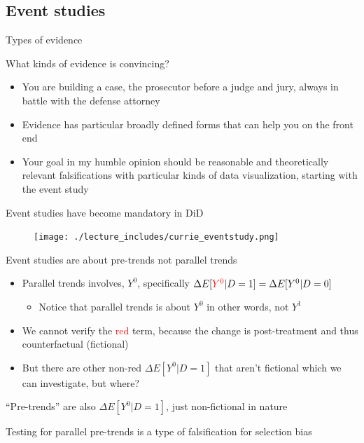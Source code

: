 \documentclass{beamer}
\begin{document}
\subsection{Event studies}

\begin{frame}{Types of evidence}

What kinds of evidence is convincing?

\begin{itemize}
\item You are building a case, the prosecutor before a judge and jury, always in battle with the defense attorney
\item Evidence has particular broadly defined forms that can help you on the front end
\item Your goal in my humble opinion should be reasonable and theoretically relevant falsifications with particular kinds of data visualization, starting with the event study
\end{itemize}

\end{frame}


\begin{frame}{Event studies have become mandatory in DiD}

	\begin{figure}
	\texttt{[image: ./lecture\_includes/currie\_eventstudy.png]}
	\end{figure}

\end{frame}

\begin{frame}{Event studies are about pre-trends not parallel trends}

\begin{itemize}
	\item Parallel trends involves, $Y^0$, specifically $\Delta E[\textcolor{red}{Y^0}|D=1] = \Delta E[Y^0|D=0]$ 
		\begin{itemize}
		\item  Notice that parallel trends is about $Y^0$ in other words, not $Y^1$
		\end{itemize}
	\item We cannot verify the \textcolor{red}{red} term, because the change is post-treatment and thus counterfactual (fictional)
	\item But there are other non-red $\Delta E[Y^0|D=1]$ that aren't fictional which we can investigate, but where?
\end{itemize}

\bigskip

``Pre-trends'' are also $\Delta E[Y^0|D=1]$, just non-fictional in nature

\bigskip

Testing for parallel pre-trends is a type of falsification for selection bias

\end{frame}
\end{document}
